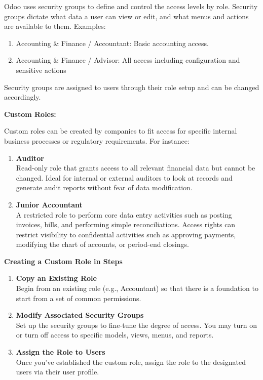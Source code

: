 \documentclass[11pt,a4paper]{article}
\begin{document}
\noindent Odoo uses security groups to define and control the access levels by role. Security groups dictate what data a user can view or edit, and what menus and actions are available to them. Examples:
\begin{enumerate}
    \item Accounting \& Finance / Accountant: Basic accounting access.
    \item Accounting \& Finance / Advisor: All access including configuration and sensitive actions
\end{enumerate}
Security groups are assigned to users through their role setup and can be changed accordingly.
\medskip

\noindent \textbf{Custom Roles:}

\noindent Custom roles can be created by companies to fit access for specific internal business processes or regulatory requirements. For instance:
\begin{enumerate}
    \item \textbf{Auditor} \\
    Read-only role that grants access to all relevant financial data but cannot be changed. Ideal for internal or external auditors to look at records and generate audit reports without fear of data modification.

    \item \textbf{Junior Accountant} \\
    A restricted role to perform core data entry activities such as posting invoices, bills, and performing simple reconciliations. Access rights can restrict visibility to confidential activities such as approving payments, modifying the chart of accounts, or period-end closings.
\end{enumerate}

\noindent\textbf{Creating a Custom Role in Steps}
\begin{enumerate}
    \item \textbf{Copy an Existing Role} \\
    Begin from an existing role (e.g., Accountant) so that there is a foundation to start from a set of common permissions.

    \item \textbf{Modify Associated Security Groups} \\
    Set up the security groups to fine-tune the degree of access. You may turn on or turn off access to specific models, views, menus, and reports.

    \item \textbf{Assign the Role to Users} \\
    Once you've established the custom role, assign the role to the designated users via their user profile.
\end{enumerate}
\end{document}
